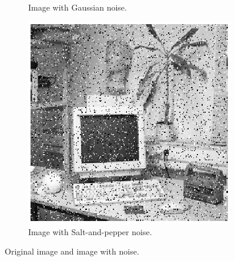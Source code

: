 \documentclass[11pt,a4paper]{article}
\begin{document}
\begin{figure}[!ht]
\begin{subfigure}[t]{.32\linewidth}
		\caption{\scriptsize Image with Gaussian noise.}
		\label{fig:officeGauss}
	\end{subfigure}
	\begin{subfigure}[t]{.32\linewidth} %
		\includegraphics[width=1.05\columnwidth]{Office_Sap_Noise.eps}
		\caption{\scriptsize Image with Salt-and-pepper noise.}
		\label{fig:officeSap}
	\end{subfigure}

	\caption{Original image and image with noise.}
	\label{fig:officeAndNoisyOffice}
\end{figure}
\end{document}
